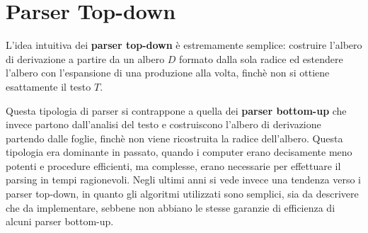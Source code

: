\section{Parser Top-down}\label{sec:parser-top-down}

L'idea intuitiva dei \textbf{parser top-down} è estremamente semplice: costruire l'albero di derivazione a partire da un albero $D$ formato dalla
sola radice ed estendere l'albero con l'espansione di una produzione alla volta, finchè non si ottiene esattamente il
testo $T$.

Questa tipologia di parser si contrappone a quella dei \textbf{parser bottom-up} che invece partono dall'analisi del
testo e costruiscono l'albero di derivazione partendo dalle foglie, finchè non viene ricostruita la radice dell'albero.
Questa tipologia era dominante in passato, quando i computer erano decisamente meno potenti e procedure efficienti, ma
complesse, erano necessarie per effettuare il parsing in tempi ragionevoli.
Negli ultimi anni si vede invece una tendenza verso i parser top-down, in quanto gli algoritmi utilizzati sono semplici,
sia da descrivere che da implementare, sebbene non abbiano le stesse garanzie di efficienza di alcuni parser bottom-up.



